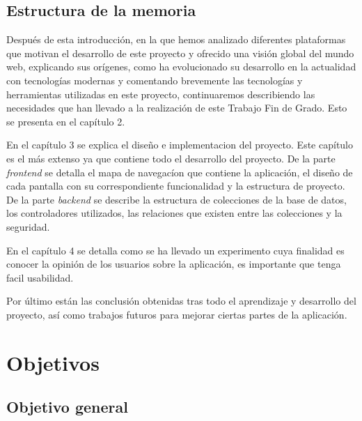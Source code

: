 \documentclass[a4paper, 12pt]{book}
\begin{document}
\section{Estructura de la memoria}
\label{sec:estructura}

Despu\'es de esta introducci\'on, en la que hemos analizado diferentes plataformas que motivan
el desarrollo de este proyecto y ofrecido una visi\'on global del mundo web, explicando
sus or\'igenes, como ha evolucionado su desarrollo en la actualidad con tecnolog\'ias modernas
y comentando brevemente las tecnolog\'ias y herramientas utilizadas en este proyecto, continuaremos
describiendo las necesidades que han llevado a la realizaci\'on de este Trabajo Fin
de Grado. Esto se presenta en el cap\'itulo 2.

En el cap\'itulo 3 se explica el dise\~no e implementacion del proyecto. Este cap\'itulo es el m\'as extenso ya que contiene todo 
el desarrollo del proyecto. De la parte \emph{frontend} se detalla el mapa de navegac\'ion que contiene la aplicaci\'on, el dise\~no de cada pantalla con su correspondiente funcionalidad y la 
estructura de proyecto. De la parte \emph{backend} se describe la estructura de colecciones de la base de datos, los controladores utilizados, las relaciones que existen entre las colecciones y 
la seguridad.

En el cap\'itulo 4 se detalla como se ha llevado un experimento cuya finalidad es conocer la opini\'on de los usuarios sobre la aplicaci\'on, es importante
que tenga facil usabilidad.

Por \'ultimo est\'an las conclusi\'on obtenidas tras todo el aprendizaje y desarrollo del proyecto, as\'i como trabajos futuros para mejorar ciertas partes
de la aplicaci\'on.




\cleardoublepage %
\chapter{Objetivos} %
\label{chap:objetivos} %

\section{Objetivo general} %
\label{sec:objetivo-general} %
\end{document}
